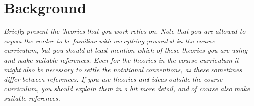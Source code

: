 \section{Background}
\label{sec:background}

\emph{Briefly present the theories that you work relies on. Note that you are allowed to expect the reader to be familiar with everything presented in the course curriculum, but you should at least mention which of these theories you are using and make suitable references. Even for the theories in the course curriculum it might also be necessary to settle the notational conventions, as these sometimes differ between references. If you use theories and ideas outside the course curriculum, you should explain them in a bit more detail, and of course also make suitable references.}
